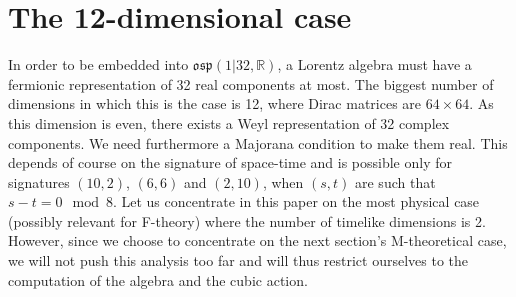 \documentclass[a4paper,11pt]{article}
\begin{document}
\section{The 12-dimensional case}

In order to be embedded into $\mathfrak{osp}(1|32,\mathbb{R})$, a Lorentz algebra
must have a fermionic representation of 32 real components at most. The
biggest number of dimensions in which this is the case is 12, where Dirac
matrices are $64\times 64$. As this dimension is even, there exists a Weyl representation
of 32 complex components. We need furthermore a Majorana condition to make
them real. This depends of course on the signature of space-time and is
possible only for signatures $(10,2)$, $(6,6)$ and $(2,10)$, when $(s,t)$ are
such that $s-t = 0 \mod 8$. Let us concentrate in this paper on the most
physical case (possibly relevant for F-theory) where the number of timelike dimensions is 2. 
However, since we choose to concentrate on the next section's M-theoretical case,
we will not push this analysis too far and will thus restrict ourselves to the computation 
of the algebra and the cubic action. 
\end{document}
